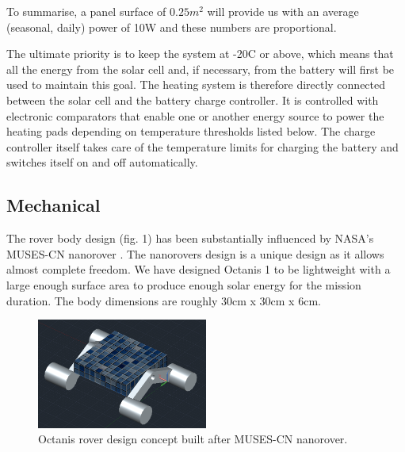 \documentclass[a4paper,12pt]{article}
\begin{document}
To summarise, a panel surface of $0.25m^2$ will provide us with an average (seasonal, daily) power of 10W and these numbers are proportional. 




The ultimate priority is to keep the system at -20\degree C or above, which means that all the energy from the solar cell and, if necessary, from the battery will first be used to maintain this goal. The heating system is therefore directly connected between the solar cell and the battery charge controller. It is controlled with electronic comparators that enable one or another energy source to power the heating pads depending on temperature thresholds listed below. The charge controller itself takes care of the temperature limits for charging the battery and switches itself on and off automatically. 


\subsection{Mechanical}
The rover body design (fig. 1) has been substantially influenced by NASA's MUSES-CN nanorover \cite{muses}. The nanorovers design is a unique design as it allows almost complete freedom. We have designed Octanis 1 to be lightweight with a large enough surface area to produce enough solar energy for the mission duration. The body dimensions are roughly 30cm x 30cm x 6cm.

\begin{figure}[h!]
	\centering
    \includegraphics[width=0.5\textwidth]{conceptrover}
    \caption{Octanis rover design concept built after MUSES-CN nanorover.}
\end{figure}
\end{document}
